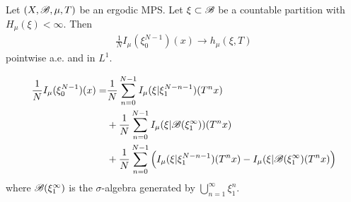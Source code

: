 \documentclass[12pt,a4paper]{report}
\newenvironment{proof}
{\begin{changemargin}{1cm}{0.5cm} 
	}%
	{\end{changemargin}
}
\begin{document}
\thm Let $(X,\mathscr{B}, \mu, T)$ be an ergodic MPS. Let $\xi \subset \mathscr{B}$ be a countable partition with $H_{\mu}(\xi) < \infty$. Then
\begin{align*}
\frac{1}{N} I_{\mu}(\xi_0^{N-1})(x) \rightarrow h_{\mu}(\xi, T)
\end{align*}
pointwise a.e. and in $L^1$.
\begin{proof}
\pf
\begin{align*}
\frac{1}{N} I_{\mu}(\xi_{0}^{N-1})(x) = &\frac{1}{N} \sum_{n=0}^{N-1} I_{\mu} (\xi | \xi_1^{N-n-1}) (T^n x) \\
& + \frac{1}{N}\sum_{n=0}^{N-1} I_{\mu}(\xi | \mathscr{B}(\xi_1^{\infty}))(T^n x) \\
& + \frac{1}{N} \sum_{n=0}^{N-1} \Big( I_{\mu}(\xi | \xi_1^{N-n-1})(T^n x) - I_{\mu}(\xi | \mathscr{B}(\xi_1^{\infty})(T^n x) \Big)
\end{align*}
where $\mathscr{B}(\xi_1^{\infty})$ is the $\sigma$-algebra generated by $\bigcup_{n=1}^{\infty} \xi_1^n$.


\end{proof}
\end{document}
